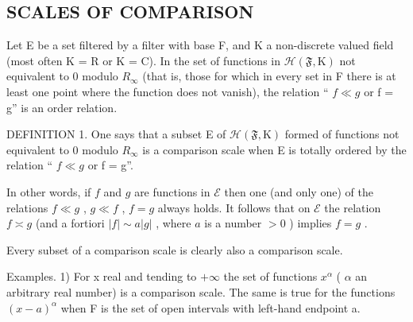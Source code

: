 \subsection{SCALES OF COMPARISON}

Let E be a set filtered by a filter with base F, and K a non-discrete valued field (most often K = R or K = C). In the set of functions in \(\mathcal{H}(\mathfrak{F}, \mathrm{K})\) not equivalent to 0 modulo \(R_{\infty}\) (that is, those for which in every set in F there is at least one point where the function does not vanish), the relation `` \(f \ll g\) or f = g'' is an order relation.

DEFINITION 1. One says that a subset E of \(\mathcal{H}(\mathfrak{F},\mathrm{K})\) formed of functions not equivalent to 0 modulo \(R_{\infty}\) is a comparison scale when E is totally ordered by the relation `` \(f \ll g\) or f = g''.

In other words, if \(f\) and \(g\) are functions in \(\mathcal{E}\) then one (and only one) of the relations \(f \ll g\) , \(g \ll f\) , \(f = g\) always holds. It follows that on \(\mathcal{E}\) the relation \(f \asymp g\) (and a fortiori \(|f| \sim a |g|\) , where \(a\) is a number \(> 0\) ) implies \(f = g\) .

Every subset of a comparison scale is clearly also a comparison scale.

Examples. 1) For x real and tending to \(+\infty\) the set of functions \(x^{\alpha}\) ( \(\alpha\) an arbitrary real number) is a comparison scale. The same is true for the functions \((x - a)^{\alpha}\) when F is the set of open intervals with left-hand endpoint a.


